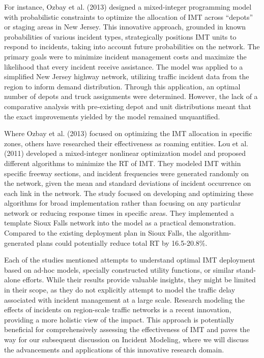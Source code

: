 \documentclass[fancy, oneside, mastersfancy, ms]{byuthesis}
\begin{document}
For instance, Ozbay et al. (2013) designed a mixed-integer programming
model with probabilistic constraints to optimize the allocation of IMT
across ``depots'' or staging areas in New Jersey. This innovative
approach, grounded in known probabilities of various incident types,
strategically positions IMT units to respond to incidents, taking into
account future probabilities on the network. The primary goals were to
minimize incident management costs and maximize the likelihood that
every incident receive assistance. The model was applied to a simplified
New Jersey highway network, utilizing traffic incident data from the
region to inform demand distribution. Through this application, an
optimal number of depots and truck assignments were determined. However,
the lack of a comparative analysis with pre-existing depot and unit
distributions meant that the exact improvements yielded by the model
remained unquantified.

Where Ozbay et al. (2013) focused on optimizing the IMT allocation in
specific zones, others have researched their effectiveness as roaming
entities. Lou et al. (2011) developed a mixed-integer nonlinear
optimization model and proposed different algorithms to minimize the RT
of IMT. They modeled IMT within specific freeway sections, and incident
frequencies were generated randomly on the network, given the mean and
standard deviations of incident occurrence on each link in the network.
The study focused on developing and optimizing these algorithms for
broad implementation rather than focusing on any particular network or
reducing response times in specific areas. They implemented a template
Sioux Falls network into the model as a practical demonstration.
Compared to the existing deployment plan in Sioux Falls, the
algorithm-generated plans could potentially reduce total RT by
16.5-20.8\%.

Each of the studies mentioned attempts to understand optimal IMT
deployment based on ad-hoc models, specially constructed utility
functions, or similar stand-alone efforts. While their results provide
valuable insights, they might be limited in their scope, as they do not
explicitly attempt to model the traffic delay associated with incident
management at a large scale. Research modeling the effects of incidents
on region-scale traffic networks is a recent innovation, providing a
more holistic view of the impact. This approach is potentially
beneficial for comprehensively assessing the effectiveness of IMT and
paves the way for our subsequent discussion on Incident Modeling, where
we will discuss the advancements and applications of this innovative
research domain.
\end{document}
